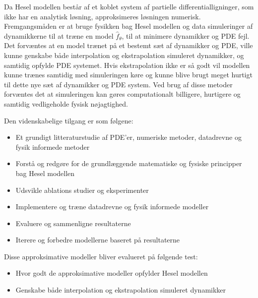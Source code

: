 Da Hesel modellen består af et koblet system af partielle differentialligninger, som ikke har en analytisk løsning, approksimeres løsningen numerisk.
Fremgangsmåden er at bruge fysikken bag Hesel modellen og data simuleringer af dynamikkerne til at træne en model $\hat{f}_{\theta}$, til at minimere dynamikker og PDE fejl.
Det forvæntes at en model trænet på et bestemt sæt af dynamikker og PDE, ville kunne genskabe både interpolation og ekstrapolation simuleret dynamikker, og samtidig opfylde PDE systemet.
Hvis ekstrapolation ikke er så godt vil modellen kunne trænes samtidig med simuleringen køre og kunne blive brugt meget hurtigt til dette nye sæt af dynamikker og PDE system.
Ved brug af disse metoder forvæntes det at simuleringen kan gøres computationalt billigere, hurtigere og samtidig vedligeholde fysisk nøjagtighed.

Den videnskabelige tilgang er som følgene:
\begin{itemize}
    \item Et grundigt litteraturstudie af PDE'er, numeriske metoder, datadrevne og fysik informede metoder
    \item Forstå og redgøre for de grundlæggende matematiske og fysiske principper bag Hesel modellen
    \item Udsvikle ablations studier og eksperimenter
    \item Implementere og træne datadrevne og fysik informede modeller
    \item Evaluere og sammenligne resultaterne
    \item Iterere og forbedre modellerne baseret på resultaterne
\end{itemize}
Disse approksimative modeller bliver evalueret på følgende test:
\begin{itemize}
    \item Hvor godt de approksimative modeller opfylder Hesel modellen
    \item Genskabe både interpolation og ekstrapolation simuleret dynamikker
\end{itemize}
